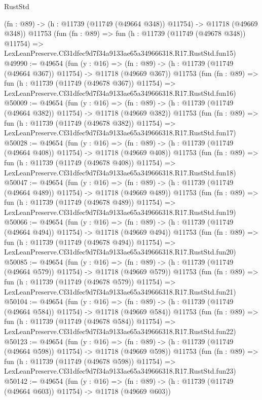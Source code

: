 \begin{lexlean}{RustStd}
\begin{coremodule}
    (fn : @89) -> (h : @11739 (@11749 (@49664 @348)) @11754) -> @11718 (@49669 @348))
    @11753
    (fun (fn : @89) =>
    fun (h : @11739 (@11749 (@49678 @348)) @11754) =>
    LexLeanPreserve.Cf31dfec9d7f34a9133ae65a349666318.R17.RustStd.fun15)
@49990 := @49654
    (fun (y : @16) =>
    (fn : @89) -> (h : @11739 (@11749 (@49664 @367)) @11754) -> @11718 (@49669 @367))
    @11753
    (fun (fn : @89) =>
    fun (h : @11739 (@11749 (@49678 @367)) @11754) =>
    LexLeanPreserve.Cf31dfec9d7f34a9133ae65a349666318.R17.RustStd.fun16)
@50009 := @49654
    (fun (y : @16) =>
    (fn : @89) -> (h : @11739 (@11749 (@49664 @382)) @11754) -> @11718 (@49669 @382))
    @11753
    (fun (fn : @89) =>
    fun (h : @11739 (@11749 (@49678 @382)) @11754) =>
    LexLeanPreserve.Cf31dfec9d7f34a9133ae65a349666318.R17.RustStd.fun17)
@50028 := @49654
    (fun (y : @16) =>
    (fn : @89) -> (h : @11739 (@11749 (@49664 @408)) @11754) -> @11718 (@49669 @408))
    @11753
    (fun (fn : @89) =>
    fun (h : @11739 (@11749 (@49678 @408)) @11754) =>
    LexLeanPreserve.Cf31dfec9d7f34a9133ae65a349666318.R17.RustStd.fun18)
@50047 := @49654
    (fun (y : @16) =>
    (fn : @89) -> (h : @11739 (@11749 (@49664 @489)) @11754) -> @11718 (@49669 @489))
    @11753
    (fun (fn : @89) =>
    fun (h : @11739 (@11749 (@49678 @489)) @11754) =>
    LexLeanPreserve.Cf31dfec9d7f34a9133ae65a349666318.R17.RustStd.fun19)
@50066 := @49654
    (fun (y : @16) =>
    (fn : @89) -> (h : @11739 (@11749 (@49664 @494)) @11754) -> @11718 (@49669 @494))
    @11753
    (fun (fn : @89) =>
    fun (h : @11739 (@11749 (@49678 @494)) @11754) =>
    LexLeanPreserve.Cf31dfec9d7f34a9133ae65a349666318.R17.RustStd.fun20)
@50085 := @49654
    (fun (y : @16) =>
    (fn : @89) -> (h : @11739 (@11749 (@49664 @579)) @11754) -> @11718 (@49669 @579))
    @11753
    (fun (fn : @89) =>
    fun (h : @11739 (@11749 (@49678 @579)) @11754) =>
    LexLeanPreserve.Cf31dfec9d7f34a9133ae65a349666318.R17.RustStd.fun21)
@50104 := @49654
    (fun (y : @16) =>
    (fn : @89) -> (h : @11739 (@11749 (@49664 @584)) @11754) -> @11718 (@49669 @584))
    @11753
    (fun (fn : @89) =>
    fun (h : @11739 (@11749 (@49678 @584)) @11754) =>
    LexLeanPreserve.Cf31dfec9d7f34a9133ae65a349666318.R17.RustStd.fun22)
@50123 := @49654
    (fun (y : @16) =>
    (fn : @89) -> (h : @11739 (@11749 (@49664 @598)) @11754) -> @11718 (@49669 @598))
    @11753
    (fun (fn : @89) =>
    fun (h : @11739 (@11749 (@49678 @598)) @11754) =>
    LexLeanPreserve.Cf31dfec9d7f34a9133ae65a349666318.R17.RustStd.fun23)
@50142 := @49654
    (fun (y : @16) =>
    (fn : @89) -> (h : @11739 (@11749 (@49664 @603)) @11754) -> @11718 (@49669 @603))

\end{coremodule}
\end{lexlean}
